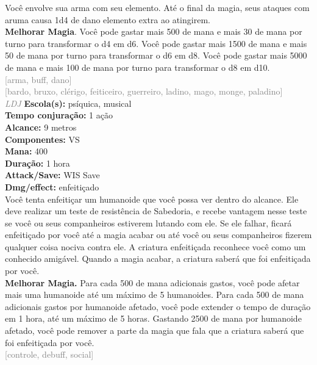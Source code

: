 \documentclass{RPG_Adventure}[2021/10/20]
\begin{document}
{\normalsize Você envolve sua arma com seu elemento. Até o final da magia, seus ataques com aruma causa 1d4 de dano elemento extra ao atingirem.\\\t \textbf{Melhorar Magia}. Você pode gastar mais 500 de mana e mais 30 de mana por turno para transformar o d4 em d6. Você pode gastar mais 1500 de mana e mais 50 de mana por turno para transformar o d6 em d8. Você pode gastar mais 5000 de mana e mais 100 de mana por turno para transformar o d8 em d10.\\}
{\scriptsize \textcolor{gray}{[arma, buff, dano]\\}}
{\scriptsize \textcolor{gray}{[bardo, bruxo, clérigo, feiticeiro, guerreiro, ladino, mago, monge, paladino]\\}}
{\tiny \textcolor{gray}{\textit{LDJ}}}
{\small \t \textbf{Escola(s):} psíquica, musical\\\t \textbf{Tempo conjuração:} 1 ação\\\t \textbf{Alcance:} 9 metros\\\t \textbf{Componentes:} VS\\\t \textbf{Mana:} 400\\\t \textbf{Duração:} 1 hora\\\t \textbf{Attack/Save:} WIS Save\\\t \textbf{Dmg/effect:} enfeitiçado\\}
{\normalsize Você tenta enfeitiçar um humanoide que você possa ver dentro do alcance. Ele deve realizar um teste de resistência de Sabedoria, e recebe vantagem nesse teste se você ou seus companheiros estiverem lutando com ele.  Se ele falhar, ficará enfeitiçado por você até a magia acabar ou até você ou seus companheiros fizerem qualquer coisa nociva contra ele. A criatura enfeitiçada reconhece você como um conhecido amigável. Quando a magia acabar, a criatura saberá que foi enfeitiçada por você.\\\t \textbf{Melhorar Magia.} Para cada 500 de mana adicionais gastos, você pode afetar mais uma humanoide até um máximo de 5 humanoides. Para cada 500 de mana adicionais gastos por humanoide afetado, você pode extender o tempo de duração em 1 hora, até um máximo de 5 horas. Gastando 2500 de mana por humanoide afetado, você pode remover a parte da magia que fala que a criatura saberá que foi enfeitiçada por você.\\}
{\scriptsize \textcolor{gray}{[controle, debuff, social]\\}}
\end{document}
